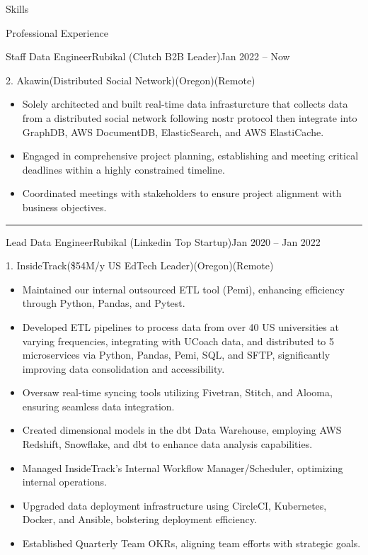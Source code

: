 \documentclass[]{ahmedamrcv}
\begin{document}
\begin{cvsection}{Skills}
\begin{cvsection}{Professional Experience}
\begin{cvsubsection}{Staff Data Engineer}{Rubikal (Clutch B2B Leader)}{Jan 2022 -- Now}
                \begin{cvsubsection}{2. Akawin}{(Distributed Social Network)}{(Oregon)(Remote)}
    			\begin{itemize}
    				\item Solely architected and built real-time data infrasturcture that collects data from a distributed social network following nostr protocol then integrate into GraphDB, AWS DocumentDB, ElasticSearch, and AWS ElastiCache.
                        \item Engaged in comprehensive project planning, establishing and meeting critical deadlines within a highly constrained timeline.
                        \item Coordinated meetings with stakeholders to ensure project alignment with business objectives.
    			\end{itemize}
    		\end{cvsubsection}
            \end{cvsubsection}

            \centering\rule{300pt}{0.4pt}
            
            \begin{cvsubsection}{Lead Data Engineer}{Rubikal (Linkedin Top Startup)}{Jan 2020 -- Jan 2022}
                \begin{cvsubsection}{1. InsideTrack}{(\$54M/y US EdTech Leader)}{(Oregon)(Remote)}
                    \begin{itemize}
    				\item Maintained our internal outsourced ETL tool (Pemi), enhancing efficiency through Python, Pandas, and Pytest.
                        \item Developed ETL pipelines to process data from over 40 US universities at varying frequencies, integrating with UCoach data, and distributed to 5 microservices via Python, Pandas, Pemi, SQL, and SFTP, significantly improving data consolidation and accessibility.
                        \item Oversaw real-time syncing tools utilizing Fivetran, Stitch, and Alooma, ensuring seamless data integration.
                        \item Created dimensional models in the dbt Data Warehouse, employing AWS Redshift, Snowflake, and dbt to enhance data analysis capabilities.
                        \item Managed InsideTrack’s Internal Workflow Manager/Scheduler, optimizing internal operations.
                        \item Upgraded data deployment infrastructure using CircleCI, Kubernetes, Docker, and Ansible, bolstering deployment efficiency.
                        \item Established Quarterly Team OKRs, aligning team efforts with strategic goals.
                    \end{itemize}
                \end{cvsubsection}
                

\end{cvsubsection}
\end{cvsection}
\end{cvsection}
\end{document}

